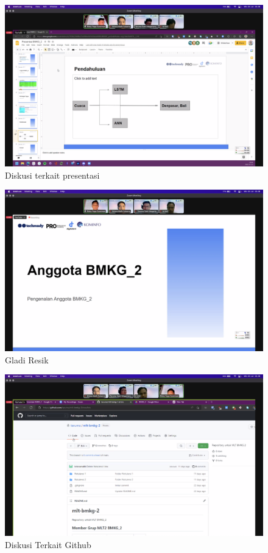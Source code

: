 \documentclass[12pt, a4paper]{article}
\begin{document}
\begin{figure}[h]
    \centering
    \includegraphics[width=\textwidth]{pert-4.2}
    \caption{Diskusi terkait presentasi}
\end{figure}

\begin{figure}[h]
    \centering
    \includegraphics[width=\textwidth]{pert-4.3}
    \caption{Gladi Resik}
\end{figure}

\begin{figure}[h]
    \centering
    \includegraphics[width=\textwidth]{pert-4.4}
    \caption{Diskusi Terkait Github}
\end{figure}
\end{document}

